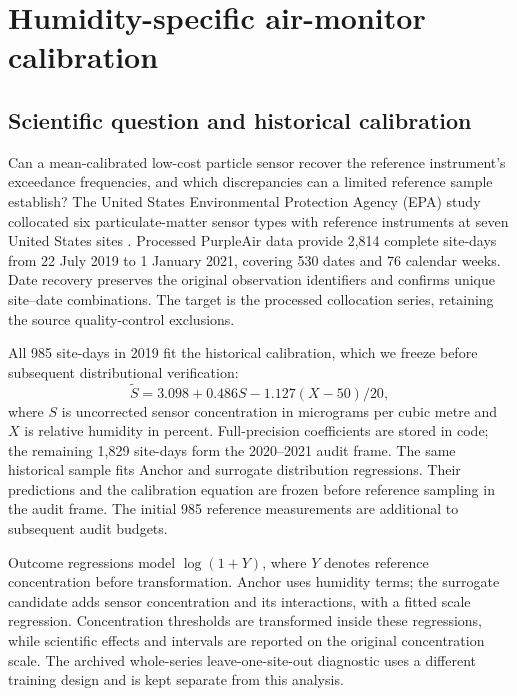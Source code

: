 \section{Humidity-specific air-monitor calibration}
\label{sec:application}
\subsection{Scientific question and historical calibration}
Can a mean-calibrated low-cost particle sensor recover the reference instrument's exceedance frequencies, and which discrepancies can a limited reference sample establish?
The United States Environmental Protection Agency (EPA) study collocated six particulate-matter sensor types with reference instruments at seven United States sites \citep{Barkjohn2025}.
Processed PurpleAir data provide 2,814 complete site-days from 22 July 2019 to 1 January 2021, covering 530 dates and 76 calendar weeks.
Date recovery preserves the original observation identifiers and confirms unique site--date combinations.
The target is the processed collocation series, retaining the source quality-control exclusions.

All 985 site-days in 2019 fit the historical calibration, which we freeze before subsequent distributional verification:
\begin{equation}\label{eq:epacal}
 \widetilde S=3.098+0.486S-1.127(X-50)/20,
\end{equation}
where $S$ is uncorrected sensor concentration in micrograms per cubic metre and $X$ is relative humidity in percent.
Full-precision coefficients are stored in code; the remaining 1,829 site-days form the 2020--2021 audit frame.
The same historical sample fits Anchor and surrogate distribution regressions.
Their predictions and the calibration equation are frozen before reference sampling in the audit frame.
The initial 985 reference measurements are additional to subsequent audit budgets.

Outcome regressions model $\log(1+Y)$, where $Y$ denotes reference concentration before transformation.
Anchor uses humidity terms; the surrogate candidate adds sensor concentration and its interactions, with a fitted scale regression.
Concentration thresholds are transformed inside these regressions, while scientific effects and intervals are reported on the original concentration scale.
The archived whole-series leave-one-site-out diagnostic uses a different training design and is kept separate from this analysis.

